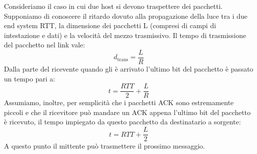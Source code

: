\documentclass{book}
\newcommand{\tmop}[1]{\ensuremath{\operatorname{#1}}}
\begin{document}
{}

Consideriamo il caso in cui due host si devono traspettere dei pacchetti.
Supponiamo di conoscere il ritardo dovuto alla propagazione della luce tra i
due end system RTT, la dimensione dei pacchetti L (compresi di campi di
intestazione e dati) e la velocit{\`a} del mezzo trasmissivo. Il tempo di
trasmissione del pacchetto nel link vale:
\[ d_{\tmop{trans}} = \frac{L}{R} \]
Dalla parte del ricevente quando gli {\`e} arrivato l'ultimo bit del pacchetto
{\`e} passato un tempo pari a:
\[ t = \frac{R T T}{2} + \frac{L}{R} \]
Assumiamo, inoltre, per semplicit{\`a} che i pacchetti ACK sono estremamente
piccoli e che il ricevitore pu{\`o} mandare un ACK appena l'ultimo bit del
pacchetto {\`e} ricevuto, il tempo impiegato da questo pacchetto da
destinatario a sorgente:
\[ t = R T T + \frac{L}{2} \]
A questo punto il mittente pu{\`o} trasmettere il prossimo messaggio.
\end{document}
